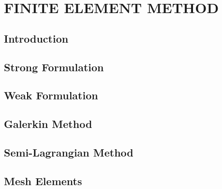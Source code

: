 \chapter{\textbf{FINITE ELEMENT METHOD}}
\label{metodo dos elementos finitos}

\section{\textbf{Introduction}} 


\section{\textbf{Strong Formulation}} 
\label{formulacao forte}



\section{\textbf{Weak Formulation}} 
\label{formulacao fraca}



\section{\textbf{Galerkin Method}} 
\label{discretizacao espaco}



\section{\textbf{Semi-Lagrangian Method}} 
\label{discretizacao tempo}



\section{\textbf{Mesh Elements}} 
\label{elemento}





